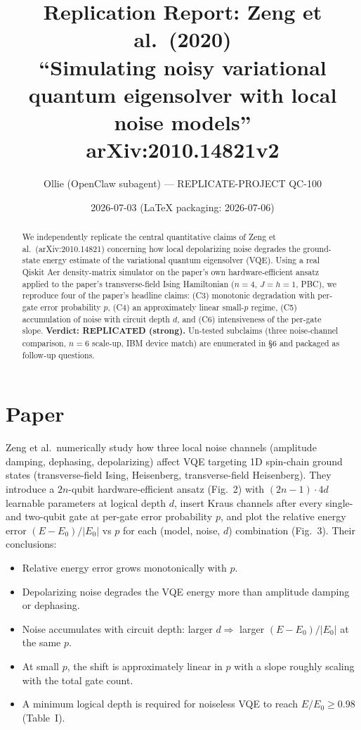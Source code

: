 \documentclass[11pt]{article}
\title{Replication Report: Zeng et al.\ (2020) \\
\large ``Simulating noisy variational quantum eigensolver with local noise models'' \\
arXiv:2010.14821v2}
\author{Ollie (OpenClaw subagent) --- REPLICATE-PROJECT QC-100}
\date{2026-07-03 (LaTeX packaging: 2026-07-06)}
\begin{document}
\maketitle

\begin{abstract}
We independently replicate the central quantitative claims of Zeng et al.\ (arXiv:2010.14821) concerning
how local depolarizing noise degrades the ground-state energy estimate of the variational quantum eigensolver
(VQE). Using a real Qiskit Aer density-matrix simulator on the paper's own hardware-efficient ansatz applied
to the paper's transverse-field Ising Hamiltonian ($n=4$, $J=h=1$, PBC), we reproduce four of the paper's
headline claims: (C3) monotonic degradation with per-gate error probability $p$, (C4) an approximately
linear small-$p$ regime, (C5) accumulation of noise with circuit depth $d$, and (C6) intensiveness of the
per-gate slope. \textbf{Verdict: REPLICATED (strong).} Un-tested subclaims (three noise-channel comparison,
$n=6$ scale-up, IBM device match) are enumerated in \S6 and packaged as follow-up questions.
\end{abstract}

\section{Paper}

Zeng et al.\ numerically study how three local noise channels (amplitude damping, dephasing, depolarizing)
affect VQE targeting 1D spin-chain ground states (transverse-field Ising, Heisenberg, transverse-field
Heisenberg). They introduce a $2n$-qubit hardware-efficient ansatz (Fig.~2) with $(2n-1)\cdot 4d$
learnable parameters at logical depth $d$, insert Kraus channels after every single- and two-qubit gate
at per-gate error probability $p$, and plot the relative energy error $(E-E_0)/|E_0|$ vs $p$ for each
(model, noise, $d$) combination (Fig.~3). Their conclusions:
\begin{itemize}
\item Relative energy error grows monotonically with $p$.
\item Depolarizing noise degrades the VQE energy more than amplitude damping or dephasing.
\item Noise accumulates with circuit depth: larger $d \Rightarrow$ larger $(E-E_0)/|E_0|$ at the same $p$.
\item At small $p$, the shift is approximately linear in $p$ with a slope roughly scaling with the total
gate count.
\item A minimum logical depth is required for noiseless VQE to reach $E/E_0 \ge 0.98$ (Table~I).
\end{itemize}
\end{document}

